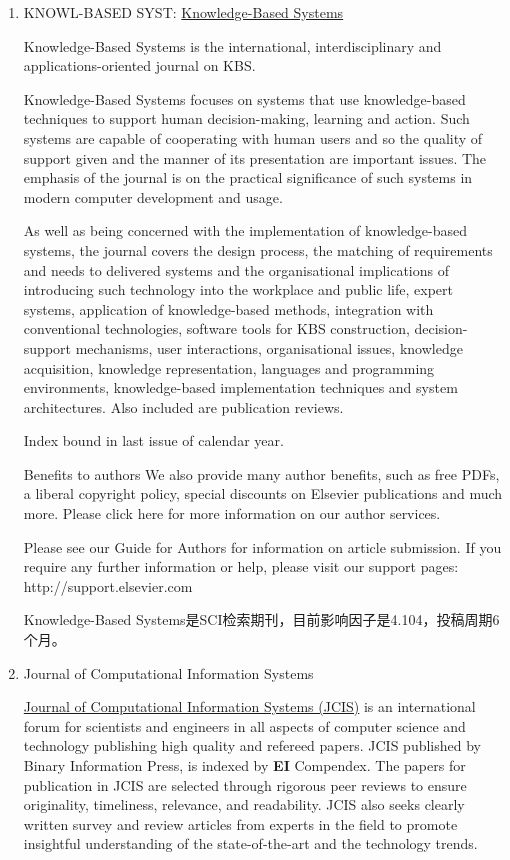 \begin{enumerate}[（1）]
\item KNOWL-BASED SYST: \href{http://www.journals.elsevier.com/knowledge-based-systems/}{Knowledge-Based Systems}

Knowledge-Based Systems is the international, interdisciplinary and applications-oriented journal on KBS.

Knowledge-Based Systems focuses on systems that use knowledge-based techniques to support human decision-making, learning and action. Such systems are capable of cooperating with human users and so the quality of support given and the manner of its presentation are important issues. The emphasis of the journal is on the practical significance of such systems in modern computer development and usage.

As well as being concerned with the implementation of knowledge-based systems, the journal covers the design process, the matching of requirements and needs to delivered systems and the organisational implications of introducing such technology into the workplace and public life, expert systems, application of knowledge-based methods, integration with conventional technologies, software tools for KBS construction, decision-support mechanisms, user interactions, organisational issues, knowledge acquisition, knowledge representation, languages and programming environments, knowledge-based implementation techniques and system architectures. Also included are publication reviews.

Index bound in last issue of calendar year.

Benefits to authors
We also provide many author benefits, such as free PDFs, a liberal copyright policy, special discounts on Elsevier publications and much more. Please click here for more information on our author services.

Please see our Guide for Authors for information on article submission. If you require any further information or help, please visit our support pages: http://support.elsevier.com

Knowledge-Based Systems是SCI检索期刊，目前影响因子是4.104，投稿周期6个月。

\item Journal of Computational Information Systems

\href{http://www.jofcis.com/index.aspx}{Journal of Computational Information Systems (JCIS)} is an international forum for scientists and engineers in all aspects of computer science and technology publishing high quality and refereed papers. JCIS published by Binary Information Press, is indexed by \textbf{EI} Compendex. The papers for publication in JCIS are selected through rigorous peer reviews to ensure originality, timeliness, relevance, and readability. JCIS also seeks clearly written survey and review articles from experts in the field to promote insightful understanding of the state-of-the-art and the technology trends.


\end{enumerate}
